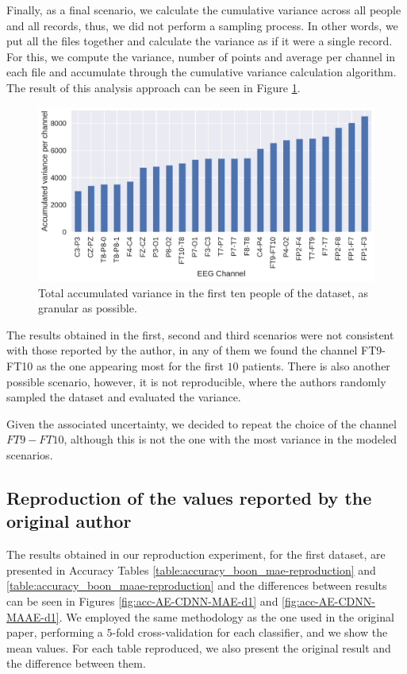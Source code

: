 Finally, as a final scenario, we calculate the cumulative variance across all people and all records, thus, we did not perform a sampling process. In other words, we put all the files together and calculate the variance as if it were a single record. For this, we compute the variance, number of points and average per channel in each file and accumulate through the cumulative variance calculation algorithm. The result of this analysis approach can be seen in Figure \ref{fig:variance_all_files}.


\begin{figure}[!ht]
  \centering
  \includegraphics[width=\linewidth]{figure/variance_all.pdf}
  \caption{Total accumulated variance in the first ten people of the dataset, as granular as possible.}
\label{fig:variance_all_files}
\end{figure}


The results obtained in the first, second and third scenarios were not consistent with those reported by the author, in any of them we found the channel FT9-FT10 as the one appearing most for the first $10$ patients. There is also another possible scenario, however, it is not reproducible, where the authors randomly sampled the dataset and evaluated the variance.

Given the associated uncertainty, we decided to repeat the choice of the channel $FT9-FT10$, although this is not the one with the most variance in the modeled scenarios.


\subsection{Reproduction of the values reported by the original author}

The results obtained in our reproduction experiment, for the first dataset, are presented in Accuracy Tables \ref{table:accuracy_boon_mae-reproduction} and \ref{table:accuracy_boon_maae-reproduction} and the differences between results can be seen in Figures \ref{fig:acc-AE-CDNN-MAE-d1} and \ref{fig:acc-AE-CDNN-MAAE-d1}. We employed the same methodology as the one used in the original paper, performing a $5$-fold cross-validation for each classifier, and we show the mean values. For each table reproduced, we also present the original result and the difference between them.


